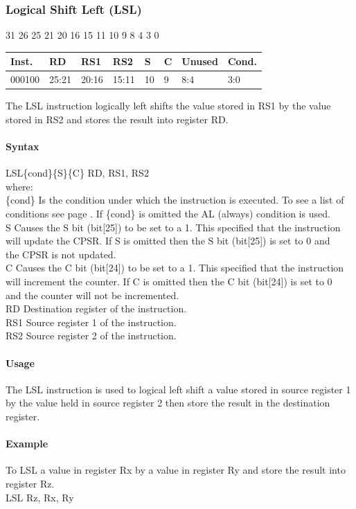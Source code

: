 \documentclass[12pt]{article}
\newcommand{\aTypeInstruction}[6]
{%
    \hspace{1.6cm}31 \hspace{1.15cm}26 \hspace{.04cm}25 \hspace{.8cm}21 \hspace{.04cm}20 \hspace{.8cm}16 \hspace{.04cm}15 \hspace{.8cm}11 \hspace{.04cm}10 \hspace{.275cm}9 \hspace{.275cm}8 \hspace{1.175cm}4 \hspace{.04cm}3 \hspace{1.25cm}0
    \vspace{-.25cm}
    \begin{center}
        \begin{tabular}{ |p{1.8cm}|p{1.5cm}|p{1.5cm}|p{1.5cm}|p{0.3cm}|p{0.3cm}|p{1.5cm}|p{1.5cm}| }
            \hline
            \textbf{Inst.} & \textbf{RD}& \textbf{RS1} & \textbf{RS2} & \textbf{S} & \textbf{C} & Unused & \textbf{Cond.}\\
            \hline
            #1 & 25:21 & 20:16 & 15:11 & 10 & 9 & 8:4 &3:0\\
            \hline
        \end{tabular}
    \end{center}
    
    \noindent
    #2\\
    
    \paragraph{Syntax}
    \begin{flushleft}
    #3\{cond\}\{S\}\{C\} RD, RS1, RS2\\
    \vspace{1em}        %
    where:\\
    \vspace{1em}
    \{cond\}    \hspace{2em} Is the condition under which the instruction is executed. To see a list of\\
                \hspace{5.4em} conditions see page . If \{cond\} is omitted the AL (always) condition is used.\\
    \vspace{1em}    
    S       \hspace{4.5em} Causes the S bit (bit[25]) to be set to a 1. This specified that the instruction\\
            \hspace{5.4em} will update the CPSR. If S is omitted then the S bit (bit[25]) is set to 0 and\\
            \hspace{5.4em} the CPSR is not updated.\\
    \vspace{1em}    
    C       \hspace{4.5em} Causes the C bit (bit[24]) to be set to a 1. This specified that the instruction\\
            \hspace{5.4em} will increment the counter. If C is omitted then the C bit (bit[24]) is set to 0\\
            \hspace{5.4em} and the counter will not be incremented.\\
    \vspace{1em}
    RD  \hspace{3.6em} Destination register of the instruction.\\
    \vspace{1em}
    RS1  \hspace{3.35em} Source register 1 of the instruction.\\
    \vspace{1em}
    RS2  \hspace{3.35em} Source register 2 of the instruction.\\
    \end{flushleft}
    
    \paragraph{Usage}
    \begin{flushleft}
    #4\\
    \end{flushleft}
    \paragraph{Example}
    \begin{flushleft}
    #5\\
    \vspace{1em}
    #6
    \end{flushleft}
    }
\begin{document}
   
   

   


    \newpage
    \subsubsection{Logical Shift Left (LSL)}
    
    \aTypeInstruction
    {000100}
    {The LSL instruction logically left shifts the value stored in RS1 by the value stored in RS2 and stores the result into register RD.}
    {LSL}
    {The LSL instruction is used to logical left shift a value stored in source register 1 by the value held in source register 2 then store the result in the destination register.}
    {To LSL a value in register Rx by a value in register Ry and store the result into register Rz.}
    {LSL Rz, Rx, Ry}
    
\end{document}
